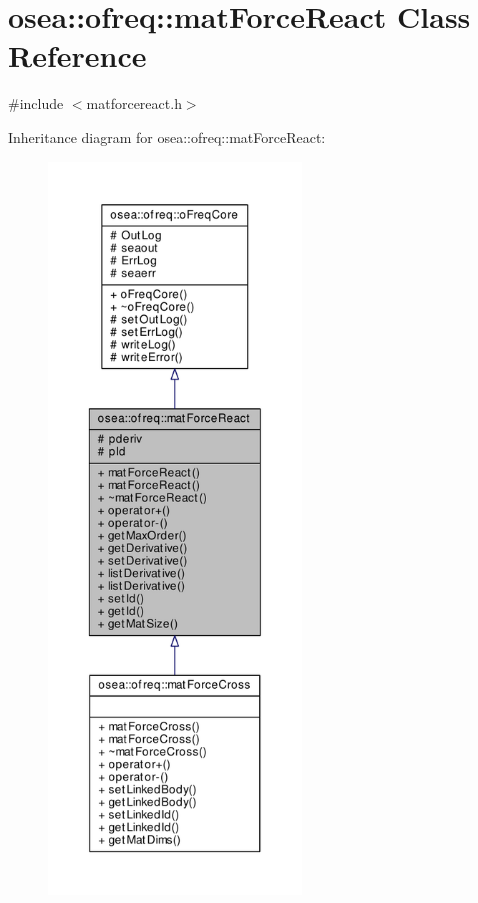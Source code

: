 \hypertarget{classosea_1_1ofreq_1_1mat_force_react}{\section{osea\-:\-:ofreq\-:\-:mat\-Force\-React Class Reference}
\label{classosea_1_1ofreq_1_1mat_force_react}
}


{\ttfamily \#include $<$matforcereact.\-h$>$}



Inheritance diagram for osea\-:\-:ofreq\-:\-:mat\-Force\-React\-:\nopagebreak
\begin{figure}[H]
\begin{center}
\leavevmode
\includegraphics[height=550pt]{classosea_1_1ofreq_1_1mat_force_react__inherit__graph}
\end{center}
\end{figure}
